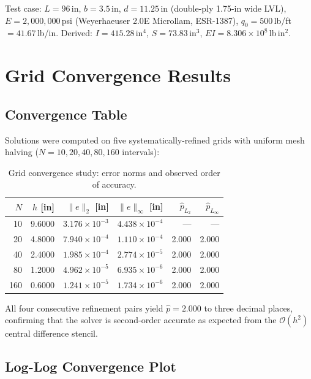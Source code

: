 \documentclass[12pt, letterpaper]{article}
\newcommand{\phat}{\hat{p}}
\begin{document}
\noindent
Test case: $L=96$\,in, $b=3.5$\,in, $d=11.25$\,in (double-ply 1.75-in wide LVL),
$E=2{,}000{,}000$\,psi (Weyerhaeuser 2.0E Microllam, ESR-1387),
$q_0=500$\,lb/ft\,$=41.67$\,lb/in.
Derived: $I=415.28$\,in$^4$, $S=73.83$\,in$^3$, $EI=8.306\times10^8$\,lb\,in$^2$.

\section{Grid Convergence Results}

\subsection{Convergence Table}

Solutions were computed on five systematically-refined grids with uniform
mesh halving ($N = 10,20,40,80,160$ intervals):

\begin{table}[ht]
\centering
\caption{Grid convergence study: error norms and observed order of accuracy.}
\label{tab:convergence}
\begin{tabular}{rrrrrr}
\toprule
$N$ & $h$ [in] & $\|e\|_2$ [in] & $\|e\|_\infty$ [in] & $\phat_{L_2}$ & $\phat_{L_\infty}$ \\
\midrule
 10 & 9.6000 & $3.176\times10^{-3}$ & $4.438\times10^{-4}$ & --- & --- \\
 20 & 4.8000 & $7.940\times10^{-4}$ & $1.110\times10^{-4}$ & 2.000 & 2.000 \\
 40 & 2.4000 & $1.985\times10^{-4}$ & $2.774\times10^{-5}$ & 2.000 & 2.000 \\
 80 & 1.2000 & $4.962\times10^{-5}$ & $6.935\times10^{-6}$ & 2.000 & 2.000 \\
160 & 0.6000 & $1.241\times10^{-5}$ & $1.734\times10^{-6}$ & 2.000 & 2.000 \\
\bottomrule
\end{tabular}
\end{table}

All four consecutive refinement pairs yield $\phat = 2.000$ to three decimal
places, confirming that the solver is second-order accurate as expected from the
$\mathcal{O}(h^2)$ central difference stencil.

\subsection{Log-Log Convergence Plot}
\end{document}
